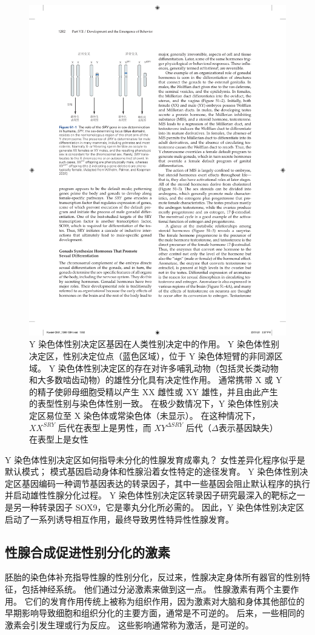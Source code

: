 \begin{figure}[htbp]
	\centering
	\includegraphics[width=0.61\linewidth]{chap51/fig_51_1}
	\caption{Y 染色体性别决定区基因在人类性别决定中的作用。
		Y 染色体性别决定区，性别决定位点（蓝色区域），位于 Y 染色体短臂的非同源区域。
		Y 染色体性别决定区的存在对许多哺乳动物（包括灵长类动物和大多数啮齿动物）的雄性分化具有决定性作用。
		通常携带 X 或 Y 的精子使卵母细胞受精以产生 XX 雌性或 XY 雄性，并且由此产生的表型性别与染色体性别一致。
		在极少数情况下，Y 染色体性别决定区易位至 X 染色体或常染色体（未显示）。
		在这种情况下，$ XX^{SRY} $ 后代在表型上是男性，而 $XY^{\Delta SRY}$ 后代（$ \Delta $表示基因缺失）在表型上是女性\cite{wilhelm2007sex} }
	\label{fig:51_1}
\end{figure}


Y 染色体性别决定区如何指导未分化的性腺发育成睾丸？
女性差异化程序似乎是默认模式；
模式基因启动身体和性腺沿着女性特定的途径发育。
Y 染色体性别决定区基因编码一种调节基因表达的转录因子，其中一些基因会阻止默认程序的执行并启动雄性性腺分化过程。
Y 染色体性别决定区转录因子研究最深入的靶标之一是另一种转录因子 SOX9，它是睾丸分化所必需的。
因此，Y 染色体性别决定区启动了一系列诱导相互作用，最终导致男性特异性性腺发育。



\subsection{性腺合成促进性别分化的激素}

胚胎的染色体补充指导性腺的性别分化，反过来，性腺决定身体所有器官的性别特征，包括神经系统。
他们通过分泌激素来做到这一点。
性腺激素有两个主要作用。
它们的发育作用传统上被称为组织作用，因为激素对大脑和身体其他部位的早期影响导致细胞和组织分化的主要方面，通常是不可逆的。
后来，一些相同的激素会引发生理或行为反应。
这些影响通常称为激活，是可逆的。


